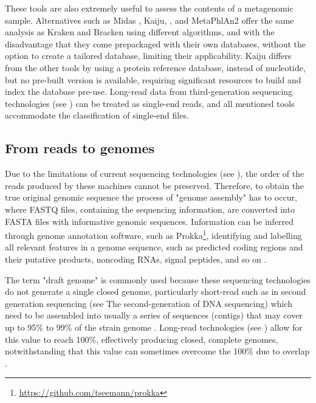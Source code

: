 These tools are also extremely useful to assess the contents of a metagenomic sample. Alternatives such as Midas \citep{nayfach_integrated_2016}, Kaiju, \citep{menzel_fast_2016}, and MetaPhlAn2 \citep{truong_metaphlan2_2015} offer the same analysis as Kraken and Bracken using different algorithms, and with the disadvantage that they come prepackaged with their own databases, without the option to create a tailored database, limiting their applicability. Kaiju differs from the other tools by using a protein reference database, instead of nucleotide, but no pre-built version is available, requiring significant resources to build and index the database pre-use. Long-read data from third-generation sequencing technologies (see ) can be treated as single-end reads, and all mentioned tools accommodate the classification of single-end files. 

\subsection{From reads to genomes} \label{ssec:_intro_reads_2_genomes}

Due to the limitations of current sequencing technologies (see ), the order of the reads produced by these machines cannot be preserved. 
Therefore, to obtain the true original genomic sequence the process of "genome assembly" has to occur, where FASTQ files, containing the sequencing information, are converted into FASTA files with informative genomic sequences. Information can be inferred through genome annotation software, such as Prokka\footnote{\url{https://github.com/tseemann/prokka}}, identifying and labelling all relevant features in a genome sequence, such as predicted coding regions and their putative products, noncoding RNAs, signal peptides, and so on \citep{seemann_prokka_2014}. 


The term "draft genome" is commonly used because these sequencing technologies do not generate a single closed genome, particularly short-read such as in second generation sequencing (see  The second-generation of DNA sequencing) which need to be assembled into usually a series of sequences (contigs) that may cover up to 95\% to 99\% of the strain genome \citep{carrico_primer_2018}. 
Long-read technologies (see ) allow for this value to reach 100\%, effectively producing closed, complete genomes, notwithstanding that this value can sometimes overcome the 100\% due to overlap \citep{wick_benchmarking_2021}.

